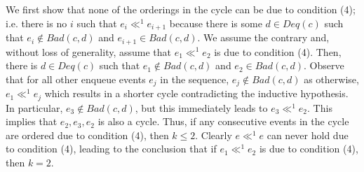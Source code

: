 \documentclass{LMCS}
\newcommand{\Deq}[1]{\ensuremath{\mathit{Deq}({#1})}}
\newcommand{\Bad}[2]{\ensuremath{\mathit{Bad}(#1,#2)}}
\begin{document}
\noindent We first show that none of the orderings in the cycle can be due to condition (4); i.e. there is no $i$ such that $e_i\ll^1 e_{i+1}$ because there is some $d\in \Deq c$ such that $e_i\notin \Bad c d$ and $e_{i+1}\in \Bad c d$. 
We assume the contrary and, without loss of generality, assume that $e_1\ll^1 e_2$ is due to condition (4).
Then, there is $d\in \Deq c$ such that $e_1\notin \Bad c d$ and $e_2\in \Bad c d$.
Observe that for all other enqueue events $e_j$ in the sequence, $e_j\notin \Bad c d$ as otherwise, $e_1\ll^1 e_j$ which results in a shorter cycle contradicting the inductive hypothesis.
In particular, $e_3\notin \Bad c d$, but this immediately leads to $e_3\ll^1 e_2$.
This implies that $e_2,e_3,e_2$ is also a cycle.
Thus, if any consecutive events in the cycle are ordered due to condition (4), then $k\leq 2$.
Clearly $e\ll^1 e$ can never hold due to condition (4), leading to the conclusion that if $e_1\ll^1 e_2$ is due to condition (4), then $k=2$.
\end{document}
